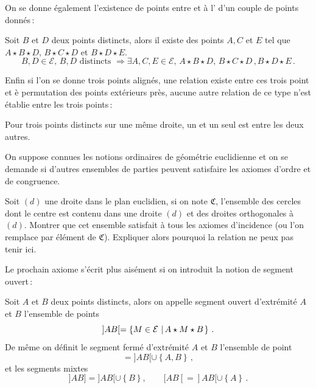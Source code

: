 On se donne également l'existence de points entre et à l' d'un couple de points donnés\,: 
\begin{axi}\label{ax-B2}
    Soit $B$ et $D$ deux points distincts, alors il existe des points $A,C$ et $E$ tel que $A\star B \star D$, $B\star C \star D$ et $B\star D \star E$.
    \begin{equation*}
        B,D\in\mathcal{E},\, B,D \text{ distincts } \Rightarrow \exists A,C,E\in\mathcal{E},\, A\star B \star D,\, B\star C \star D\,, B\star D \star E\,.
    \end{equation*}
\end{axi}
Enfin si l'on se donne trois points alignés, une relation  existe entre ces trois point et è permutation des points extérieurs près, aucune autre relation de ce type n'est établie entre les trois points\,:
\begin{axi}\label{ax-B3}
    Pour trois points distincts sur une même droite, un et un seul est entre les deux autres.
\end{axi}
\begin{exo}
On suppose connues les notions ordinaires de géométrie euclidienne et on se demande si d'autres ensembles de parties peuvent satisfaire les axiomes d'ordre et de congruence. 

Soit $(d)$ une droite dans le plan euclidien, si on note $\mathfrak{C}$, l'ensemble des cercles dont le centre est contenu dans une droite $(d)$ et des droites orthogonales à $(d)$. Montrer que cet ensemble satisfait à tous les axiomes d'incidence (ou l'on remplace  par élément de $\mathfrak{C}$). Expliquer alors pourquoi la relation  ne peux pas tenir ici.
\end{exo}
Le prochain axiome s'écrit plus aisément si on introduit la notion de segment ouvert\,: 
\begin{defi}[Segment]\label{defi-segment}
Soit $A$ et $B$ deux points distincts, alors on appelle segment ouvert d'extrémité $A$ et $B$ l'ensemble de points
\begin{equation*}
    ]AB[ = \left\{M\in\mathcal{E}\,\left|\,A\star M \star B\right.\right\}\,.
\end{equation*}
De même on définit le segment fermé d'extrémité $A$ et $B$ l'ensemble de point
\begin{equation*}
    [AB] = ]AB[\cup \left\{A,B\right\}\,,
\end{equation*}
et les segments mixtes
\begin{equation*}
    ]AB] = ]AB[\cup \left\{B\right\},\qquad [AB[ = ]AB[\cup \left\{A\right\}\,.
\end{equation*}
\end{defi}
